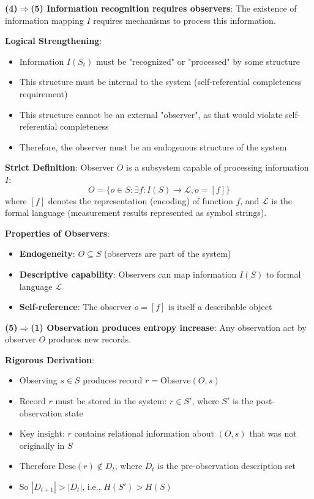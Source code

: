 \textbf{(4)$\Rightarrow$(5) Information recognition requires observers}:
The existence of information mapping $I$ requires mechanisms to process this information.

\textbf{Logical Strengthening}:
\begin{itemize}
\item Information $I(S_t)$ must be "recognized" or "processed" by some structure
\item This structure must be internal to the system (self-referential completeness requirement)
\item This structure cannot be an external "observer", as that would violate self-referential completeness
\item Therefore, the observer must be an endogenous structure of the system
\end{itemize}

\textbf{Strict Definition}: Observer $O$ is a subsystem capable of processing information $I$:
\begin{equation}
O = \{o \in S : \exists f: I(S) \to \mathcal{L}, o = [f]\}
\end{equation}
where $[f]$ denotes the representation (encoding) of function $f$, and $\mathcal{L}$ is the formal language (measurement results represented as symbol strings).

\textbf{Properties of Observers}:
\begin{itemize}
\item \textbf{Endogeneity}: $O \subseteq S$ (observers are part of the system)
\item \textbf{Descriptive capability}: Observers can map information $I(S)$ to formal language $\mathcal{L}$
\item \textbf{Self-reference}: The observer $o = [f]$ is itself a describable object
\end{itemize}

\textbf{(5)$\Rightarrow$(1) Observation produces entropy increase}:
Any observation act by observer $O$ produces new records.

\textbf{Rigorous Derivation}:
\begin{itemize}
\item Observing $s \in S$ produces record $r = \text{Observe}(O, s)$
\item Record $r$ must be stored in the system: $r \in S'$, where $S'$ is the post-observation state
\item Key insight: $r$ contains relational information about $(O, s)$ that was not originally in $S$
\item Therefore $\text{Desc}(r) \notin D_t$, where $D_t$ is the pre-observation description set
\item So $|D_{t+1}| > |D_t|$, i.e., $H(S') > H(S)$
\end{itemize}

